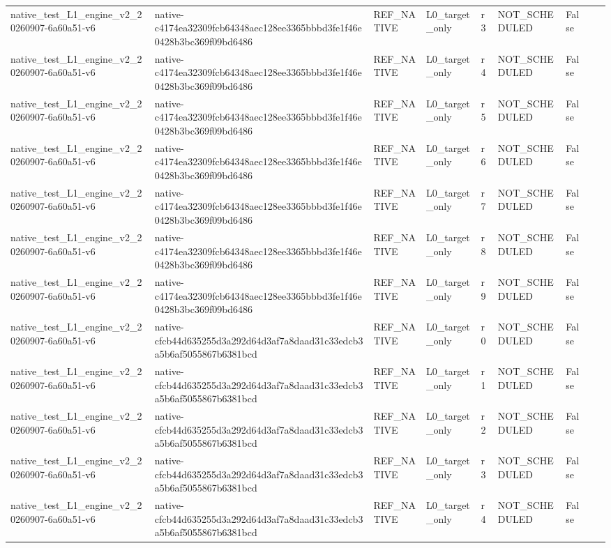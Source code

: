 \begin{tabular}{lllllllll}
native\_test\_L1\_engine\_v2\_20260907-6a60a51-v6 & native-c4174ea32309fcb64348aec128ee3365bbbd3fe1f46e0428b3bc369f09bd6486 & REF\_NATIVE & L0\_target\_only & r3 & NOT\_SCHEDULED & False &  &  \\
native\_test\_L1\_engine\_v2\_20260907-6a60a51-v6 & native-c4174ea32309fcb64348aec128ee3365bbbd3fe1f46e0428b3bc369f09bd6486 & REF\_NATIVE & L0\_target\_only & r4 & NOT\_SCHEDULED & False &  &  \\
native\_test\_L1\_engine\_v2\_20260907-6a60a51-v6 & native-c4174ea32309fcb64348aec128ee3365bbbd3fe1f46e0428b3bc369f09bd6486 & REF\_NATIVE & L0\_target\_only & r5 & NOT\_SCHEDULED & False &  &  \\
native\_test\_L1\_engine\_v2\_20260907-6a60a51-v6 & native-c4174ea32309fcb64348aec128ee3365bbbd3fe1f46e0428b3bc369f09bd6486 & REF\_NATIVE & L0\_target\_only & r6 & NOT\_SCHEDULED & False &  &  \\
native\_test\_L1\_engine\_v2\_20260907-6a60a51-v6 & native-c4174ea32309fcb64348aec128ee3365bbbd3fe1f46e0428b3bc369f09bd6486 & REF\_NATIVE & L0\_target\_only & r7 & NOT\_SCHEDULED & False &  &  \\
native\_test\_L1\_engine\_v2\_20260907-6a60a51-v6 & native-c4174ea32309fcb64348aec128ee3365bbbd3fe1f46e0428b3bc369f09bd6486 & REF\_NATIVE & L0\_target\_only & r8 & NOT\_SCHEDULED & False &  &  \\
native\_test\_L1\_engine\_v2\_20260907-6a60a51-v6 & native-c4174ea32309fcb64348aec128ee3365bbbd3fe1f46e0428b3bc369f09bd6486 & REF\_NATIVE & L0\_target\_only & r9 & NOT\_SCHEDULED & False &  &  \\
native\_test\_L1\_engine\_v2\_20260907-6a60a51-v6 & native-cfcb44d635255d3a292d64d3af7a8daad31c33edcb3a5b6af5055867b6381bcd & REF\_NATIVE & L0\_target\_only & r0 & NOT\_SCHEDULED & False &  &  \\
native\_test\_L1\_engine\_v2\_20260907-6a60a51-v6 & native-cfcb44d635255d3a292d64d3af7a8daad31c33edcb3a5b6af5055867b6381bcd & REF\_NATIVE & L0\_target\_only & r1 & NOT\_SCHEDULED & False &  &  \\
native\_test\_L1\_engine\_v2\_20260907-6a60a51-v6 & native-cfcb44d635255d3a292d64d3af7a8daad31c33edcb3a5b6af5055867b6381bcd & REF\_NATIVE & L0\_target\_only & r2 & NOT\_SCHEDULED & False &  &  \\
native\_test\_L1\_engine\_v2\_20260907-6a60a51-v6 & native-cfcb44d635255d3a292d64d3af7a8daad31c33edcb3a5b6af5055867b6381bcd & REF\_NATIVE & L0\_target\_only & r3 & NOT\_SCHEDULED & False &  &  \\
native\_test\_L1\_engine\_v2\_20260907-6a60a51-v6 & native-cfcb44d635255d3a292d64d3af7a8daad31c33edcb3a5b6af5055867b6381bcd & REF\_NATIVE & L0\_target\_only & r4 & NOT\_SCHEDULED & False &  &  \\

\end{tabular}
